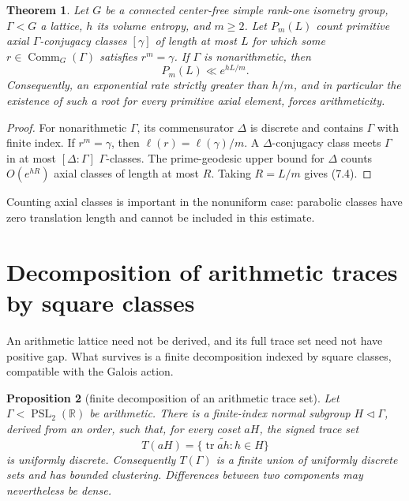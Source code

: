 \documentclass[11pt,reqno]{amsart}
\newtheorem{theorem}{Theorem}[section]
\newtheorem{proposition}[theorem]{Proposition}
\theoremstyle{definition}
\theoremstyle{remark}
\newcommand{\R}{\mathbb R}
\newcommand{\Tr}{\operatorname{tr}}
\newcommand{\Comm}{\operatorname{Comm}}
\newcommand{\PSL}{\operatorname{PSL}}
\begin{document}
\begin{theorem}\label{thm:root-commensurator}
Let \(G\) be a connected center-free simple rank-one isometry group,
\(\Gamma<G\) a lattice, \(h\) its volume entropy, and \(m\ge2\).  Let
\(P_m(L)\) count primitive axial \(\Gamma\)-conjugacy classes \([\gamma]\) of
length at most \(L\) for which some \(r\in\Comm_G(\Gamma)\) satisfies
\(r^m=\gamma\).  If \(\Gamma\) is nonarithmetic, then
\[
 P_m(L)\ll e^{hL/m}.
\tag{7.4}
\]
Consequently, an exponential rate strictly greater than \(h/m\), and in
particular the existence of such a root for every primitive axial element,
forces arithmeticity.
\end{theorem}

\begin{proof}
For nonarithmetic \(\Gamma\), its commensurator \(\Delta\) is discrete and
contains \(\Gamma\) with finite index.  If \(r^m=\gamma\), then
\(\ell(r)=\ell(\gamma)/m\).  A \(\Delta\)-conjugacy class meets \(\Gamma\) in
at most \([\Delta:\Gamma]\) \(\Gamma\)-classes.  The prime-geodesic upper
bound for \(\Delta\) counts \(O(e^{hR})\) axial classes of length at most
\(R\).  Taking \(R=L/m\) gives (7.4).
\end{proof}

Counting axial classes is important in the nonuniform case: parabolic classes
have zero translation length and cannot be included in this estimate.

\section{Decomposition of arithmetic traces by square classes}

An arithmetic lattice need not be derived, and its full trace set need not
have positive gap.  What survives is a finite decomposition indexed by
square classes, compatible with the Galois action.

\begin{proposition}[finite decomposition of an arithmetic trace set]\label{prop:arith-colors}
Let \(\Gamma<\PSL_2(\R)\) be arithmetic.  There is a finite-index normal
subgroup \(H\lhd\Gamma\), derived from an order, such that, for every coset
\(aH\), the signed
trace set
\[
 T(aH)=\{\Tr\widetilde{ah}:h\in H\}
\]
is uniformly discrete.  Consequently \(T(\Gamma)\) is a finite union of
uniformly discrete sets and has bounded clustering.  Differences between
two components may nevertheless be dense.
\end{proposition}
\end{document}
